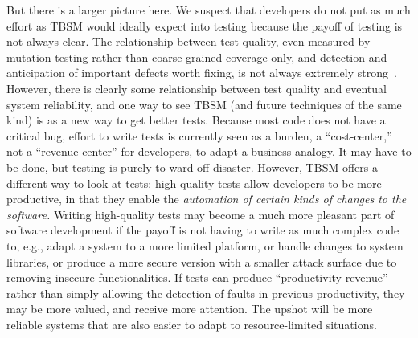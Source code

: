 But there is a larger picture here.  We suspect that developers do not put as much effort as TBSM would ideally expect into testing because the payoff of testing is not always clear.  The relationship between test quality, even measured by mutation testing rather than coarse-grained coverage only, and detection and anticipation of important defects worth fixing, is not always extremely strong~\cite{Testedness}.  However, there is clearly some relationship between test quality and eventual system reliability, and one way to see TBSM (and future techniques of the same kind) is as a new way to get better tests.  Because most code does not have a critical bug, effort to write tests is currently seen as a burden, a ``cost-center,'' not a ``revenue-center'' for developers, to adapt a business analogy.  It may have to be done, but testing is purely to ward off disaster.  However, TBSM offers a different way to look at tests:  high quality tests allow developers to be more productive, in that they enable the \emph{automation of certain kinds of changes to the software.}  Writing high-quality tests may become a much more pleasant part of software development if the payoff is not having to write as much complex code to, e.g., adapt a system to a more limited platform, or handle changes to system libraries, or produce a more secure version with a smaller attack surface due to removing insecure functionalities.  If tests can produce ``productivity revenue'' rather than simply allowing the detection of faults in previous productivity, they may be more valued, and receive more attention.  The upshot will be more reliable systems that are also easier to adapt to resource-limited situations.
